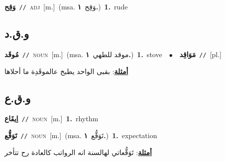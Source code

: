 \documentclass[10pt,a4paper,twoside]{article} %
\begin{document}
\begin{multicols}{2}
{\setlength\topsep{0pt}\textbf{\foreignlanguage{arabic}{وَقِح}}\ {\color{gray}\texttt{//}\color{black}}\ \textsc{adj}\ [m.]\ \color{gray}(msa. \foreignlanguage{arabic}{وَقِح}~\foreignlanguage{arabic}{\textbf{١.}})\color{black}\ \textbf{1.}~rude\ } \vspace{2mm}

\vspace{-3mm}
\subsection*{\color{blue}\foreignlanguage{arabic}{و.ق.د}\color{blue}{}} 

{\setlength\topsep{0pt}\textbf{\foreignlanguage{arabic}{مُوقَد}}\ {\color{gray}\texttt{//}\color{black}}\ \textsc{noun}\ [m.]\ \color{gray}(msa. \foreignlanguage{arabic}{موقد للطهي}~\foreignlanguage{arabic}{\textbf{١.}})\color{black}\ \textbf{1.}~stove\ \ $\bullet$\ \ \setlength\topsep{0pt}\textbf{\foreignlanguage{arabic}{مَوَاقِد}}\ {\color{gray}\texttt{//}\color{black}}\ [pl.]\  \begin{flushright}\color{gray}\foreignlanguage{arabic}{\textbf{\underline{\foreignlanguage{arabic}{أمثلة}}}: بقبى الواحد يطبخ عالموقَدِة ما أحلاها}\end{flushright}\color{black}} \vspace{2mm}

\vspace{-3mm}
\subsection*{\color{blue}\foreignlanguage{arabic}{و.ق.ع}\color{blue}{}} 

{\setlength\topsep{0pt}\textbf{\foreignlanguage{arabic}{اِيقَاع}}\ {\color{gray}\texttt{//}\color{black}}\ \textsc{noun}\ [m.]\ \textbf{1.}~rhythm\ } \vspace{2mm}

{\setlength\topsep{0pt}\textbf{\foreignlanguage{arabic}{تَوَقُّع}}\ {\color{gray}\texttt{//}\color{black}}\ \textsc{noun}\ [m.]\ \color{gray}(msa. \foreignlanguage{arabic}{تَوَقُّع}~\foreignlanguage{arabic}{\textbf{١.}})\color{black}\ \textbf{1.}~expectation\  \begin{flushright}\color{gray}\foreignlanguage{arabic}{\textbf{\underline{\foreignlanguage{arabic}{أمثلة}}}: تَوَقُّعاتي لهالسنة انه الرواتب كالعادة رح تتأخر}\end{flushright}\color{black}} \vspace{2mm}


\end{multicols}
\end{document}
